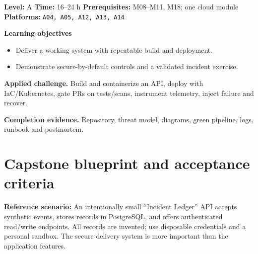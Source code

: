 \documentclass[10pt,letterpaper,oneside]{article}
\begin{document}
\vspace{2.5pt}
\begin{skillbox}[title={M23 \quad Integrated secure-delivery capstone}]
\textbf{Level:} A \quad \textbf{Time:} 16--24 h \quad \textbf{Prerequisites:} M08--M11, M18; one cloud module\\
\textbf{Platforms:} \texttt{A04, A05, A12, A13, A14}\par
\textbf{Learning objectives}
\begin{itemize}
\item Deliver a working system with repeatable build and deployment.
\item Demonstrate secure-by-default controls and a validated incident exercise.
\end{itemize}
\textbf{Applied challenge.} Build and containerize an API, deploy with IaC/Kubernetes, gate PRs on tests/scans, instrument telemetry, inject failure and recover.\par
\textbf{Completion evidence.} Repository, threat model, diagrams, green pipeline, logs, runbook and postmortem.\par
\end{skillbox}
\vspace{2.5pt}
\section{Capstone blueprint and acceptance criteria}
\begin{notebox}
\textbf{Reference scenario:} An intentionally small ``Incident Ledger'' API accepts synthetic events, stores records in PostgreSQL, and offers authenticated read/write endpoints. All records are invented; use disposable credentials and a personal sandbox. The secure delivery system is more important than the application features.
\end{notebox}
\end{document}
